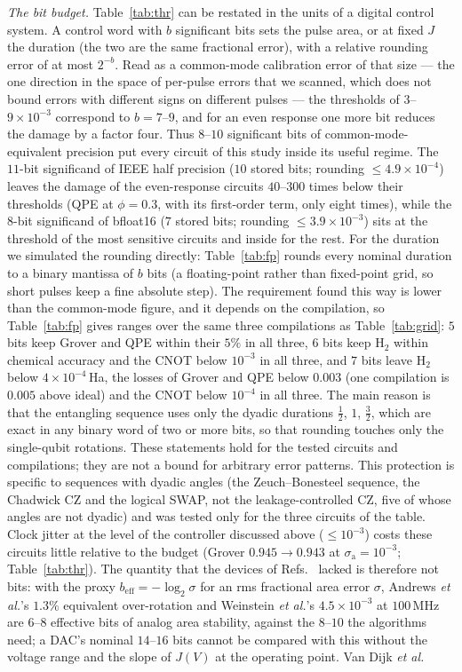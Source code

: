 \documentclass[reprint,aps,pra,amsmath,amssymb,superscriptaddress,letterpaper]{revtex4-2}
\newcommand{\Hz}{\mathrm{H}_2}
\begin{document}
\emph{The bit budget.} Table~\ref{tab:thr} can be restated in the units of a
digital control system. A control word with $b$ significant bits sets the pulse area, or at fixed $J$ the duration (the two are the same fractional error), with a relative rounding error of at most $2^{-b}$. Read as a common-mode calibration error of that size --- the one direction in the space of per-pulse errors that we scanned, which does not bound errors with different signs on different pulses --- the thresholds of $3$--$9\times10^{-3}$ correspond to $b=7$--$9$, and for an even response one more bit reduces the damage by a factor four. Thus $8$--$10$ significant bits of common-mode-equivalent precision put every circuit of this study inside its useful regime. The $11$-bit significand of IEEE half precision ($10$ stored bits; rounding $\le4.9\times10^{-4}$) leaves the damage of the even-response circuits $40$--$300$ times below their thresholds (QPE at $\phi=0.3$, with its first-order term, only eight times), while the $8$-bit significand of bfloat16 ($7$ stored bits; rounding $\le3.9\times10^{-3}$) sits at the threshold of the most sensitive circuits and inside for the rest. For
the duration we simulated the rounding directly: Table~\ref{tab:fp} rounds
every nominal duration to a binary mantissa of $b$ bits (a floating-point
rather than fixed-point grid, so short pulses keep a fine absolute step). The requirement found this way is lower than the common-mode figure, and it depends on the compilation, so Table~\ref{tab:fp} gives ranges over the same three compilations as Table~\ref{tab:grid}: $5$ bits keep Grover and QPE within their $5\%$ in all three, $6$ bits keep $\Hz$ within chemical accuracy and the CNOT below $10^{-3}$ in all three, and $7$ bits leave $\Hz$ below $4\times10^{-4}$\,Ha, the losses of Grover and QPE below $0.003$ (one compilation is $0.005$ above ideal) and the CNOT below $10^{-4}$ in all three. The main reason is that the entangling sequence uses only the dyadic durations $\tfrac12$, $1$, $\tfrac32$, which are exact in any binary word of two or more bits, so that rounding touches only the single-qubit rotations. These statements hold for the tested circuits and compilations; they are not a bound for arbitrary error patterns. This protection is specific to sequences with dyadic angles (the Zeuch--Bonesteel sequence, the Chadwick CZ and the logical SWAP, not the leakage-controlled CZ, five of whose angles are not dyadic) and was tested only for the three circuits of the table. Clock jitter at the level of the controller discussed above ($\le10^{-3}$) costs these circuits little relative to the budget (Grover $0.945\to0.943$ at $\sigma_{\mathrm a}=10^{-3}$; Table~\ref{tab:thr}). The quantity that the devices of Refs.~\cite{andrews2019,weinstein2023} lacked is therefore not bits: with the proxy $b_{\mathrm{eff}}=-\log_2\sigma$ for an rms fractional area error $\sigma$, Andrews \emph{et al.}'s $1.3\%$ equivalent over-rotation and Weinstein \emph{et al.}'s $4.5\times10^{-3}$ at $100$\,MHz are $6$--$8$ effective bits of analog area stability, against the $8$--$10$ the algorithms need; a DAC's nominal $14$--$16$ bits cannot be compared with this without the voltage range and the slope of $J(V)$ at the operating point. Van Dijk \emph{et al.}~\cite{vandijk2019}
\end{document}
